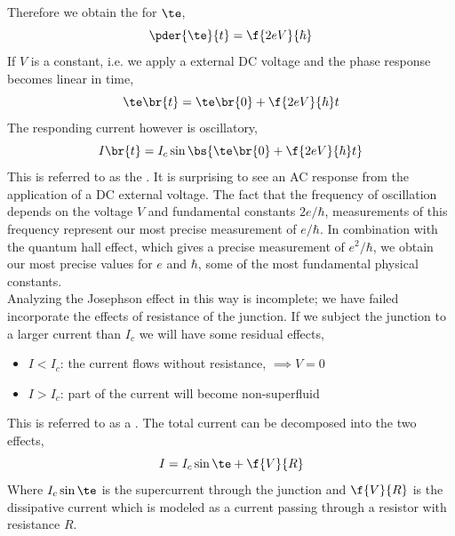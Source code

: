 \documentclass{article}
\begin{document}
Therefore we obtain the  for $\te$,
\[ \pder{\te}{t} = \f{2eV}{\hbar} \]
If $V$ is a constant, i.e. we apply a external DC voltage and the phase response becomes linear in time,
\[ \te\br{t} = \te\br{0} + \f{2eV}{\hbar}t \]
The responding current however is oscillatory,
\[ I\br{t} = I_c \sin \bs{\te\br{0} + \f{2eV}{\hbar}t} \]
This is referred to as the . It is surprising to see an AC response from the application of a DC external voltage. The fact that the frequency of oscillation depends on the voltage $V$ and fundamental constants $2e/\hbar$, measurements of this frequency represent our most precise measurement of ${e}/{\hbar}$. In combination with the quantum hall effect, which gives a precise measurement of $e^2/\hbar$, we obtain our most precise values for $e$ and $\hbar$, some of the most fundamental physical constants.\\

Analyzing the Josephson effect in this way is incomplete; we have failed incorporate the effects of resistance of the junction. If we subject the junction to a larger current than $I_c$ we will have some residual effects,

\begin{itemize}
    \item $I < I_c$: the current flows without resistance, $\implies V = 0$
    \item $I > I_c$: part of the current will become non-superfluid
\end{itemize}
This is referred to as a . The total current can be decomposed into the two effects,
\[ I = I_c \sin \te + \f{V}{R} \]
Where $I_c\sin\te$ is the supercurrent through the junction and $\f{V}{R}$ is the dissipative current which is modeled as a current passing through a resistor with resistance $R$.\\
\end{document}
